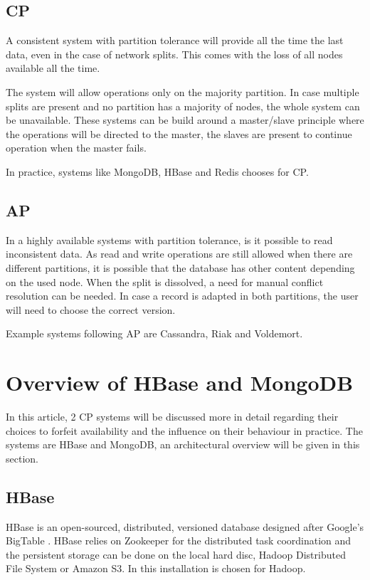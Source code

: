 \documentclass[final,5p,times]{elsarticle}
\begin{document}
\subsection{CP}
A consistent system with partition tolerance will provide all the time the last data, even in the case of network splits. This comes with the loss of all nodes available all the time. 

The system will allow operations only on the majority partition. In case multiple splits are present and no partition has a majority of nodes, the whole system can be unavailable. These systems can be build around a master/slave principle where the operations will be directed to the master, the slaves are present to continue operation when the master fails.

In practice, systems like MongoDB, HBase and Redis chooses for CP. 

\subsection{AP}
In a highly available systems with partition tolerance, is it possible to read inconsistent data. As read and write operations are still allowed when there are different partitions, it is possible that the database has other content depending on the used node. When the split is dissolved, a need for manual conflict resolution can be needed. In case a record is adapted in both partitions, the user will need to choose the correct version. 

Example systems following AP are Cassandra, Riak and Voldemort. 

\section{Overview of HBase and MongoDB}
In this article, 2 CP systems will be discussed more in detail regarding their choices to forfeit availability and the influence on their behaviour in practice. The systems are HBase and MongoDB, an architectural overview will be given in this section. 

\subsection{HBase}
HBase\cite{hbase-doc} is an open-sourced, distributed, versioned database designed after Google's BigTable \cite{chang2008bigtable}. HBase relies on Zookeeper for the distributed task coordination and the persistent storage can be done on the local hard disc, Hadoop Distributed File System or Amazon S3. In this installation is chosen for Hadoop. 
\end{document}
